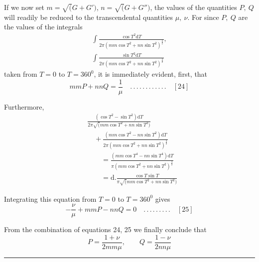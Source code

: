 If we now set $m=\surd(G+G')$, $n=\surd(G+G'')$, the values of the quantities $P,\ Q$ will readily be reduced to the transcendental quantities $\mu,\ \nu$. For since $P,\ Q$ are the values of the integrals
\[
\begin{gathered}\int\frac{\cos T^2\mathrm{d}T}{2\pi(mm\cos T^2+nn\sin T^2)^{\frac32}},\\[7pt]\int\frac{\sin T^2\mathrm{d}T}{2\pi(mm\cos T^2+nn\sin T^2)^{\frac32}}\end{gathered}
\]
taken from $T=0$ to $T=360^{0}$, it is immediately evident, first, that
\[
mmP+nnQ=\frac{1}{\mu}\quad .\, .\, .\, .\, .\, .\, .\, .\, .\, .\, .\, .\quad[24]
\]
\par Furthermore,
\[
\begin{aligned}
&\frac{(\cos T^2-\sin T^2)\mathrm{d}T}{2\pi\surd(mm\cos T^2+nn\sin T^2)}\\[7pt]&\quad+\frac{(mm\cos T^2-nn\sin T^2)\mathrm{d}T}{2\pi(mm\cos T^2+nn\sin T^2)^{\frac32}}\\[6pt]
&\qquad=\frac{(mm\cos T^4-nn\sin T^4)\mathrm{d}T}{\pi(mm\cos T^2+nn\sin T^2)^{\frac32}}\\[6pt]
&\qquad=\mathrm{d}.\frac{\cos T\sin T}{\pi\surd(mm\cos T^2+nn\sin T^2)}
\end{aligned}
\]
\par Integrating this equation from $T=0$ to $T=360^{0}$ gives
\[
-\frac{\nu}{\mu}+mmP-nnQ=0\quad .\, .\, .\, .\, .\, .\, .\, .\, .\quad[25]
\]
\par From the combination of equations 24, 25 we finally conclude that
\[
P=\frac{1+\nu}{2mm\mu},\qquad Q=\frac{1-\nu}{2nn\mu}
\]
\begin{center}\rule{0.22\textwidth}{0.4pt}\end{center}
\clearpage
\endgroup
